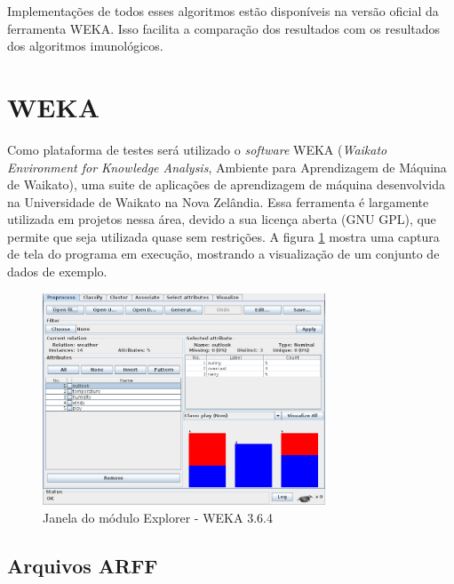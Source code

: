 Implementações de todos esses algoritmos estão disponíveis na versão oficial da ferramenta WEKA. Isso facilita a comparação dos resultados com os resultados dos algoritmos imunológicos.

\section{WEKA}
\label{sec:prop_weka}

Como plataforma de testes será utilizado o \emph{software} WEKA (\emph{Waikato Environment for Knowledge Analysis}, Ambiente para Aprendizagem de Máquina de Waikato), uma suite de aplicações de aprendizagem de máquina desenvolvida na Universidade de Waikato na Nova Zelândia. Essa ferramenta é largamente utilizada em projetos nessa área, devido a sua licença aberta (GNU GPL), que permite que seja utilizada quase sem restrições. A figura \ref{fig:prop_weka} mostra uma captura de tela do programa em execução, mostrando a visualização de um conjunto de dados de exemplo.

\vspace{0.5cm}
\begin{figure}[h]
    \centering
    \caption{Janela do módulo Explorer - WEKA 3.6.4}
    \label{fig:prop_weka}
    \vspace{0.5cm}
    \includegraphics[width=0.75\textwidth]{img/weka.png}
\end{figure}
\vspace{0.5cm}

\subsection{Arquivos ARFF}
\label{sec:prop_arff}

